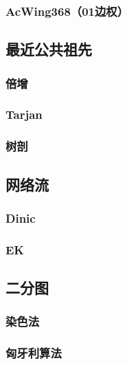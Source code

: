 \documentclass[12pt,a4paper]{article}
\begin{document}
\subsubsection{AcWing368（01边权）}
\begin{spacing}{1.5}

\end{spacing}

\subsection{最近公共祖先}
\subsubsection{倍增}

\subsubsection{Tarjan}

\subsubsection{树剖}

\subsection{网络流}
\subsubsection{Dinic}
\begin{spacing}{1.5}

\end{spacing}

\subsubsection{EK}

\subsection{二分图}
\subsubsection{染色法}

\subsubsection{匈牙利算法}

\end{document}
